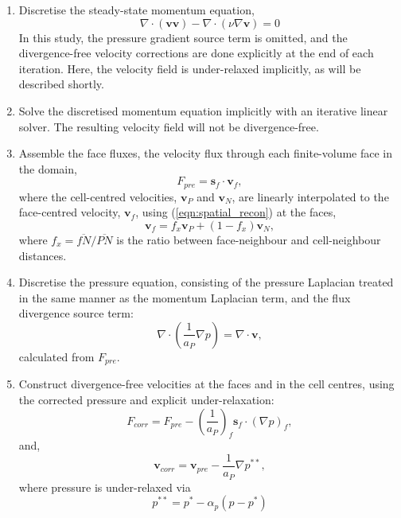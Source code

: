 \documentclass[final,3p,times,twocolumn]{elsarticle}
\begin{document}
\begin{enumerate}
    \item Discretise the steady-state momentum equation, 
    \begin{equation}
        \nabla \cdot (\mathbf{v} \mathbf{v}) - \nabla \cdot (\nu \nabla \mathbf{v}) = 0
        \label{eqn:momentum_disc}
    \end{equation}
     In this study, the pressure gradient source term is omitted, and the divergence-free velocity corrections are done explicitly at the end of each iteration. Here, the velocity field is under-relaxed implicitly, as will be described shortly.
    \item Solve the discretised momentum equation implicitly with an iterative linear solver. The resulting velocity field will not be divergence-free.
    \item Assemble the face fluxes, the velocity flux through each finite-volume face in the domain, 
    \begin{equation}
        F_{pre} = \mathbf{s}_f \cdot \mathbf{v}_f ,
        \label{eqn:face_pre}
    \end{equation}
    where the cell-centred velocities, $\mathbf{v}_P$ and $\mathbf{v}_N$, are linearly interpolated to the face-centred velocity, $\mathbf{v}_f$, using (\ref{eqn:spatial_recon}) at the faces, 
    \begin{equation}
        \mathbf{v}_f = f_x \mathbf{v}_P + (1-f_x) \mathbf{v}_N ,
        \label{eqn:v_face}
    \end{equation}
    where $f_x = \overline{fN}/\overline{PN}$ is the ratio between face-neighbour and cell-neighbour distances.
    \item Discretise the pressure equation, consisting of the pressure Laplacian treated in the same manner as the momentum Laplacian term, and the flux divergence source term:
    \begin{equation}
        \nabla \cdot \left( \frac{1}{a_P} \nabla p \right) = \nabla \cdot \mathbf{v} ,
        \label{eqn:pressure_corr}
    \end{equation}
    calculated from $F_{pre}$.
    \item Construct divergence-free velocities at the faces and in the cell centres, using the corrected pressure and explicit under-relaxation:
    \begin{equation}
        F_{corr} = F_{pre} - \left( \frac{1}{a_P} \right)_f \mathbf{s}_f  \cdot (\nabla p)_f ,
        \label{eqn:flux_corr}
    \end{equation}
    and,
    \begin{equation}
        \mathbf{v}_{corr} = \mathbf{v}_{pre} - \frac{1}{a_P} \nabla p^{**}, 
        \label{eqn:velocity_corr}
    \end{equation}
    where pressure is under-relaxed via $$p^{**} = p^* - \alpha _p (p-p^*)$$
\end{enumerate}
\end{document}

